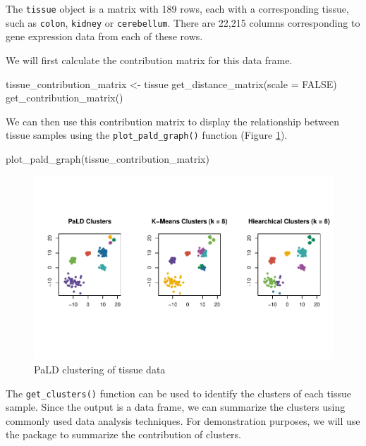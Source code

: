 The \texttt{tissue} object is a matrix with 189 rows, each with a
corresponding tissue, such as \texttt{colon}, \texttt{kidney} or
\texttt{cerebellum}. There are 22,215 columns corresponding to gene
expression data from each of these rows.

We will first calculate the contribution matrix for this data frame.

\begin{Schunk}
\begin{Sinput}
tissue_contribution_matrix <- tissue %
  get_distance_matrix(scale = FALSE) %
  get_contribution_matrix()
\end{Sinput}
\end{Schunk}

We can then use this contribution matrix to display the relationship
between tissue samples using the \texttt{plot\_pald\_graph()} function
(Figure \ref{fig:fig5}).

\begin{Schunk}
\begin{Sinput}
plot_pald_graph(tissue_contribution_matrix)
\end{Sinput}
\begin{figure}
\includegraphics{manuscript_files/figure-latex/fig5-1} \caption[PaLD clustering of tissue data]{PaLD clustering of tissue data}\label{fig:fig5}
\end{figure}
\end{Schunk}

The \texttt{get\_clusters()} function can be used to identify the
clusters of each tissue sample. Since the output is a data frame, we can
summarize the clusters using commonly used data analysis techniques. For
demonstration purposes, we will use the  package to
summarize the contribution of clusters.

